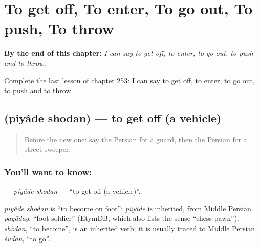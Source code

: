 
\chapter{To get off, To enter, To go out, To push, To throw}
\label{ch:fa-to-get-off-to-enter-to-go-out-to-push-to-throw}

\begin{chapteropening}
\textbf{By the end of this chapter:} \emph{I can say to get off, to enter, to go out, to push and to throw.}

Complete the last lesson of chapter 253: I can say to get off, to enter, to go out, to push and to throw.
\end{chapteropening}

\section[\texorpdfstring{\fa{پیاده} \fa{شدن} (piyâde shodan)}{پیاده شدن (piyâde shodan)}]{  (piyâde shodan) — to get off (a vehicle)}

\label{lesson:FA-C253-piyade-shodan}



\begin{quote}
Before the new one: say the Persian for a guard, then the Persian for a street sweeper.
\end{quote}

\subsection*{You'll want to know:  }
\textbf{ } — \emph{piyâde shodan} — \textquotedblleft{}to get off (a vehicle)\textquotedblright{}.

\begin{cousinweb}
\emph{piyâde shodan} is \textquotedblleft{}to become on foot\textquotedblright{}: \emph{piyâde} is inherited, from Middle Persian \emph{payādag}, \textquotedblleft{}foot soldier\textquotedblright{} (EtymDB, which also lists the sense \textquotedblleft{}chess pawn\textquotedblright{}). \emph{shodan}, \textquotedblleft{}to become\textquotedblright{}, is an inherited verb; it is usually traced to Middle Persian \emph{šudan}, \textquotedblleft{}to go\textquotedblright{}.
\end{cousinweb}

